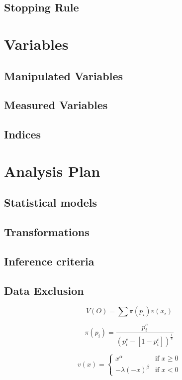 \documentclass{article}
\begin{document}
    \subsection{Stopping Rule}
    \section{Variables}
    \subsection{Manipulated Variables}
    \subsection{Measured Variables}
    \subsection{Indices}
    \section{Analysis Plan}
    \subsection{Statistical models}
    \subsection{Transformations}
    \subsection{Inference criteria}
    \subsection{Data Exclusion}





    $$V(O) = \sum \pi (p_i)v(x_i) $$

    $$\pi(p_i) = \frac{p_i^c}{(p_i^c-[1-p_i^c])^\frac{1}{c}}$$

    $$v(x) = \begin{cases}
        x^\alpha & \text{if } x \geq 0 \\
        -\lambda(-x)^\beta & \text{if } x < 0 
    \end{cases}$$
\end{document}
